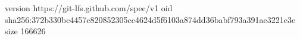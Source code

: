 version https://git-lfs.github.com/spec/v1
oid sha256:372b330bc4457c820852305cc4624d5f6103a874dd36babf793a391ae3221c3e
size 166626
